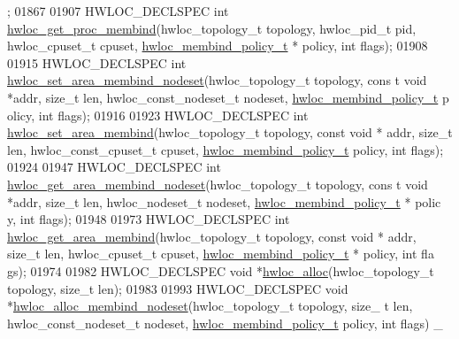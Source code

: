 \begin{DoxyCode}
      ;
01867 
01907 HWLOC\_DECLSPEC \textcolor{keywordtype}{int} \hyperlink{a00050_gabaf9c13f1fa301d6895594cec52226e2}{hwloc_get_proc_membind}(hwloc\_topology\_t topology, hwloc\_pid\_t 
      pid, hwloc\_cpuset\_t cpuset, \hyperlink{a00050_gac9764f79505775d06407b40f5e4661e8}{hwloc_membind_policy_t} * policy, \textcolor{keywordtype}{int} flags);
01908 
01915 HWLOC\_DECLSPEC \textcolor{keywordtype}{int} \hyperlink{a00050_gade5e2c28ea8475a479bf2b1df36c6ccd}{hwloc_set_area_membind_nodeset}(hwloc\_topology\_t topology, \textcolor{keyword}{cons
      t} \textcolor{keywordtype}{void} *addr, \textcolor{keywordtype}{size\_t} len, hwloc\_const\_nodeset\_t nodeset, \hyperlink{a00050_gac9764f79505775d06407b40f5e4661e8}{hwloc_membind_policy_t} p
      olicy, \textcolor{keywordtype}{int} flags);
01916 
01923 HWLOC\_DECLSPEC \textcolor{keywordtype}{int} \hyperlink{a00050_ga06594edeb4728cb9e014aed924d1e74a}{hwloc_set_area_membind}(hwloc\_topology\_t topology, \textcolor{keyword}{const} \textcolor{keywordtype}{void} *
      addr, \textcolor{keywordtype}{size\_t} len, hwloc\_const\_cpuset\_t cpuset, \hyperlink{a00050_gac9764f79505775d06407b40f5e4661e8}{hwloc_membind_policy_t} policy, \textcolor{keywordtype}{int
      } flags);
01924 
01947 HWLOC\_DECLSPEC \textcolor{keywordtype}{int} \hyperlink{a00050_ga106e6fcd764d17be682faf7a5bc95720}{hwloc_get_area_membind_nodeset}(hwloc\_topology\_t topology, \textcolor{keyword}{cons
      t} \textcolor{keywordtype}{void} *addr, \textcolor{keywordtype}{size\_t} len, hwloc\_nodeset\_t nodeset, \hyperlink{a00050_gac9764f79505775d06407b40f5e4661e8}{hwloc_membind_policy_t} * polic
      y, \textcolor{keywordtype}{int} flags);
01948 
01973 HWLOC\_DECLSPEC \textcolor{keywordtype}{int} \hyperlink{a00050_gac02ee8f7606382ea7855ae4e1656ed0f}{hwloc_get_area_membind}(hwloc\_topology\_t topology, \textcolor{keyword}{const} \textcolor{keywordtype}{void} *
      addr, \textcolor{keywordtype}{size\_t} len, hwloc\_cpuset\_t cpuset, \hyperlink{a00050_gac9764f79505775d06407b40f5e4661e8}{hwloc_membind_policy_t} * policy, \textcolor{keywordtype}{int} fla
      gs);
01974 
01982 HWLOC\_DECLSPEC \textcolor{keywordtype}{void} *\hyperlink{a00050_gac5586e58cf25c3596b7d4aa31ce13259}{hwloc_alloc}(hwloc\_topology\_t topology, \textcolor{keywordtype}{size\_t} len);
01983 
01993 HWLOC\_DECLSPEC \textcolor{keywordtype}{void} *\hyperlink{a00050_gaeaa00714a9c4319bda0a74ca6f8720e8}{hwloc_alloc_membind_nodeset}(hwloc\_topology\_t topology, \textcolor{keywordtype}{size\_
      t} len, hwloc\_const\_nodeset\_t nodeset, \hyperlink{a00050_gac9764f79505775d06407b40f5e4661e8}{hwloc_membind_policy_t} policy, \textcolor{keywordtype}{int} flags) \_

\end{DoxyCode}
